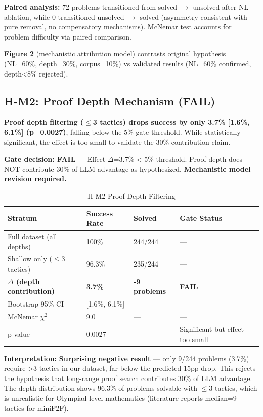 \textbf{Paired analysis:} 72 problems transitioned from solved $\rightarrow$ unsolved after NL ablation, while 0 transitioned unsolved $\rightarrow$ solved (asymmetry consistent with pure removal, no compensatory mechanisms). McNemar test accounts for problem difficulty via paired comparison.

\textbf{Figure 2} (mechanistic attribution model) contrasts original hypothesis (NL=60\%, depth=30\%, corpus=10\%) vs validated results (NL=60\% confirmed, depth<8\% rejected).

\subsection{H-M2: Proof Depth Mechanism (FAIL)}

\textbf{Proof depth filtering ($\leq$3 tactics) drops success by only 3.7\% [1.6\%, 6.1\%] (p=0.0027)}, falling below the 5\% gate threshold. While statistically significant, the effect is too small to validate the 30\% contribution claim.

\textbf{Gate decision: FAIL} --- Effect $\Delta$=3.7\% < 5\% threshold. Proof depth does NOT contribute 30\% of LLM advantage as hypothesized. \textbf{Mechanistic model revision required.}

\begin{table}[h]
\centering
\small
\begin{tabular}{llll}
\toprule
\textbf{Stratum} & \textbf{Success Rate} & \textbf{Solved} & \textbf{Gate Status} \\
\midrule
Full dataset (all depths) & 100\% & 244/244 & --- \\
Shallow only ($\leq$3 tactics) & 96.3\% & 235/244 & --- \\
\textbf{$\Delta$ (depth contribution)} & \textbf{3.7\%} & \textbf{-9 problems} & \textbf{FAIL} \\
Bootstrap 95\% CI & [1.6\%, 6.1\%] & --- & --- \\
McNemar $\chi^2$ & 9.0 & --- & --- \\
p-value & 0.0027 & --- & Significant but effect too small \\
\bottomrule
\end{tabular}
\caption{H-M2 Proof Depth Filtering}
\end{table}

\textbf{Interpretation:} \textbf{Surprising negative result} --- only 9/244 problems (3.7\%) require >3 tactics in our dataset, far below the predicted 15pp drop. This rejects the hypothesis that long-range proof search contributes 30\% of LLM advantage. The depth distribution shows 96.3\% of problems solvable with $\leq$3 tactics, which is unrealistic for Olympiad-level mathematics (literature reports median=9 tactics for miniF2F).

